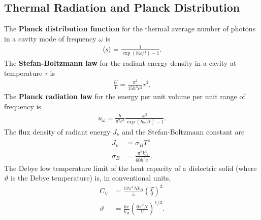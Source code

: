 \begin{multicols}{2}
	\section{Thermal Radiation and Planck Distribution}
	The \textbf{Planck distribution function} for the thermal average number of photons in a cavity mode of frequency $\omega$ is
	\begin{align}
		\langle s \rangle = \frac{1}{\exp(\hbar \omega/t)-1}.
	\end{align}
	The \textbf{Stefan-Boltzmann law} for the radiant energy density in a cavity at temperature $\tau$ is
	\begin{align}
		\frac{U}{V} = \frac{\pi^2}{15\hbar^3 c^3}\tau^4.	
	\end{align}
	The \textbf{Planck radiation law} for the energy per unit volume per unit range of frequency is
	\begin{align}
		u_\omega = \frac{\hbar}{\pi^2c^3}\frac{\omega^3}{\exp(\hbar \omega/t)-1}.
	\end{align}
	The flux density of radiant energy $J_\nu$ and the Stefan-Boltzmann constant are
	\begin{align}
		J_\nu &= \sigma_BT^4 \\
		\sigma_B &= \frac{\pi^2k_B^4}{60\hbar^3c^3}.
	\end{align}
	The Debye low temperature limit of the heat capacity of a dielectric solid (where $\vartheta$ is the Debye temperature) is, in conventional units,
	\begin{align}
		C_V &= \frac{12\pi^4Nk_B}{5}\left(\frac{T}{\vartheta}\right)^3 \\
		\vartheta &= \frac{\hbar c}{k_B}\left(\frac{6\pi^2N}{V}\right)^{1/3}.
	\end{align}

\end{multicols}
